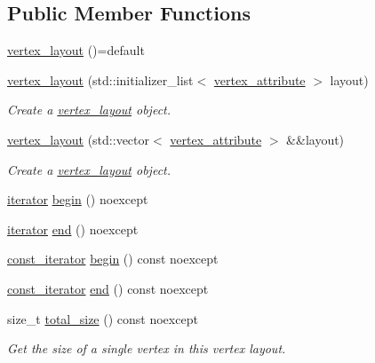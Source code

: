 \subsection*{Public Member Functions}
\begin{DoxyCompactItemize}
\item 
\mbox{\hyperlink{classmoka_1_1vertex__layout_a926b9988d845d058fff534685e6d96a7}{vertex\+\_\+layout}} ()=default
\item 
\mbox{\hyperlink{classmoka_1_1vertex__layout_ad70128d474027c554da27cbcf1b3ec62}{vertex\+\_\+layout}} (std\+::initializer\+\_\+list$<$ \mbox{\hyperlink{structmoka_1_1vertex__attribute}{vertex\+\_\+attribute}} $>$ layout)
\begin{DoxyCompactList}\small\item\em Create a \mbox{\hyperlink{classmoka_1_1vertex__layout}{vertex\+\_\+layout}} object. \end{DoxyCompactList}\item 
\mbox{\hyperlink{classmoka_1_1vertex__layout_ac5a5fa1f71676e010832f049533bd5ef}{vertex\+\_\+layout}} (std\+::vector$<$ \mbox{\hyperlink{structmoka_1_1vertex__attribute}{vertex\+\_\+attribute}} $>$ \&\&layout)
\begin{DoxyCompactList}\small\item\em Create a \mbox{\hyperlink{classmoka_1_1vertex__layout}{vertex\+\_\+layout}} object. \end{DoxyCompactList}\item 
\mbox{\hyperlink{classmoka_1_1vertex__layout_ae9f116229b2836d428a9d39d41028058}{iterator}} \mbox{\hyperlink{classmoka_1_1vertex__layout_a4b36db21d5660940650759fc91b5697a}{begin}} () noexcept
\item 
\mbox{\hyperlink{classmoka_1_1vertex__layout_ae9f116229b2836d428a9d39d41028058}{iterator}} \mbox{\hyperlink{classmoka_1_1vertex__layout_ae7a46396dfd0bab6b7fd6e1e68d0b317}{end}} () noexcept
\item 
\mbox{\hyperlink{classmoka_1_1vertex__layout_ab39e7bec44dbfcac3d5154f8574b198c}{const\+\_\+iterator}} \mbox{\hyperlink{classmoka_1_1vertex__layout_aec84dfcd503dfa8546ecb32c443ac1b0}{begin}} () const noexcept
\item 
\mbox{\hyperlink{classmoka_1_1vertex__layout_ab39e7bec44dbfcac3d5154f8574b198c}{const\+\_\+iterator}} \mbox{\hyperlink{classmoka_1_1vertex__layout_a8a353c67a3878e14a76ff7bc985215f4}{end}} () const noexcept
\item 
size\+\_\+t \mbox{\hyperlink{classmoka_1_1vertex__layout_aa501fb01d39fcb5cb632f81e4b729e42}{total\+\_\+size}} () const noexcept
\begin{DoxyCompactList}\small\item\em Get the size of a single vertex in this vertex layout. \end{DoxyCompactList}\end{DoxyCompactItemize}


